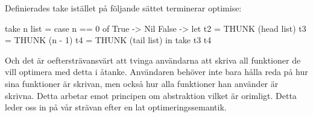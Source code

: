 \documentclass[../Optimise]{subfiles}
\begin{document}
Definierades take istället på följande sättet terminerar optimise:

\begin{codeEx}
  take n list = case n == 0 of
                    True -> Nil
                    False -> let t2 = THUNK (head list)
                                 t3 = THUNK (n - 1)
                                 t4 = THUNK (tail list)
                             in  take t3 t4
\end{codeEx}

Och det är oeftersträvansvärt att tvinga användarna att skriva all funktioner
de vill optimera med detta i åtanke. Användaren behöver inte bara hålla reda på hur sina funktioner är skrivan, men också hur alla funktioner han använder är skrivna. Detta arbetar emot principen om abstraktion vilket är orimligt. Detta leder oss in på vår strävan
efter en lat optimeringssemantik.
\end{document}
